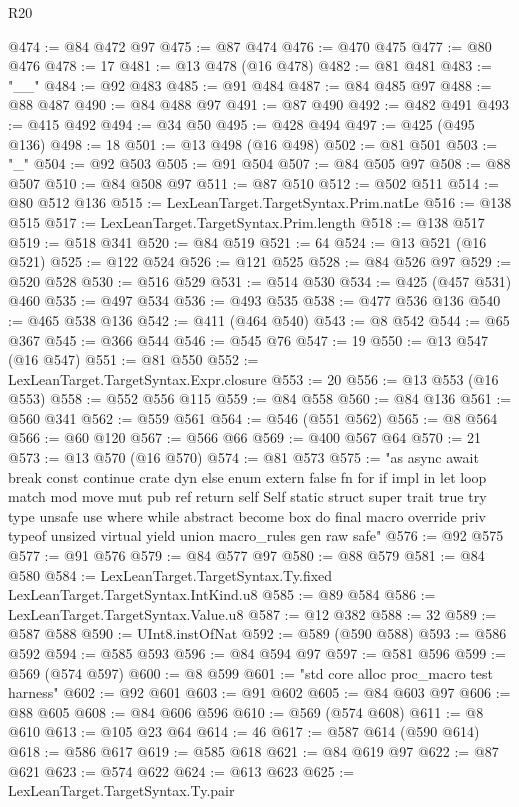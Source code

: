 \begin{lexlean}{R20}
\begin{coremodule}
@474 := @84 @472 @97
@475 := @87 @474
@476 := @470 @475
@477 := @80 @476
@478 := 17
@481 := @13 @478 (@16 @478)
@482 := @81 @481
@483 := "__"
@484 := @92 @483
@485 := @91 @484
@487 := @84 @485 @97
@488 := @88 @487
@490 := @84 @488 @97
@491 := @87 @490
@492 := @482 @491
@493 := @415 @492
@494 := @34 @50
@495 := @428 @494
@497 := @425 (@495 @136)
@498 := 18
@501 := @13 @498 (@16 @498)
@502 := @81 @501
@503 := "_"
@504 := @92 @503
@505 := @91 @504
@507 := @84 @505 @97
@508 := @88 @507
@510 := @84 @508 @97
@511 := @87 @510
@512 := @502 @511
@514 := @80 @512 @136
@515 := LexLeanTarget.TargetSyntax.Prim.natLe
@516 := @138 @515
@517 := LexLeanTarget.TargetSyntax.Prim.length
@518 := @138 @517
@519 := @518 @341
@520 := @84 @519
@521 := 64
@524 := @13 @521 (@16 @521)
@525 := @122 @524
@526 := @121 @525
@528 := @84 @526 @97
@529 := @520 @528
@530 := @516 @529
@531 := @514 @530
@534 := @425 (@457 @531) @460
@535 := @497 @534
@536 := @493 @535
@538 := @477 @536 @136
@540 := @465 @538 @136
@542 := @411 (@464 @540)
@543 := @8 @542
@544 := @65 @367
@545 := @366 @544
@546 := @545 @76
@547 := 19
@550 := @13 @547 (@16 @547)
@551 := @81 @550
@552 := LexLeanTarget.TargetSyntax.Expr.closure
@553 := 20
@556 := @13 @553 (@16 @553)
@558 := @552 @556 @115
@559 := @84 @558
@560 := @84 @136
@561 := @560 @341
@562 := @559 @561
@564 := @546 (@551 @562)
@565 := @8 @564
@566 := @60 @120
@567 := @566 @66
@569 := @400 @567 @64
@570 := 21
@573 := @13 @570 (@16 @570)
@574 := @81 @573
@575 := "as async await break const continue crate dyn else enum extern false fn for if impl in let loop match mod move mut pub ref return self Self static struct super trait true try type unsafe use where while abstract become box do final macro override priv typeof unsized virtual yield union macro_rules gen raw safe"
@576 := @92 @575
@577 := @91 @576
@579 := @84 @577 @97
@580 := @88 @579
@581 := @84 @580
@584 := LexLeanTarget.TargetSyntax.Ty.fixed LexLeanTarget.TargetSyntax.IntKind.u8
@585 := @89 @584
@586 := LexLeanTarget.TargetSyntax.Value.u8
@587 := @12 @382
@588 := 32
@589 := @587 @588
@590 := UInt8.instOfNat
@592 := @589 (@590 @588)
@593 := @586 @592
@594 := @585 @593
@596 := @84 @594 @97
@597 := @581 @596
@599 := @569 (@574 @597)
@600 := @8 @599
@601 := "std core alloc proc_macro test harness"
@602 := @92 @601
@603 := @91 @602
@605 := @84 @603 @97
@606 := @88 @605
@608 := @84 @606 @596
@610 := @569 (@574 @608)
@611 := @8 @610
@613 := @105 @23 @64
@614 := 46
@617 := @587 @614 (@590 @614)
@618 := @586 @617
@619 := @585 @618
@621 := @84 @619 @97
@622 := @87 @621
@623 := @574 @622
@624 := @613 @623
@625 := LexLeanTarget.TargetSyntax.Ty.pair

\end{coremodule}
\end{lexlean}
